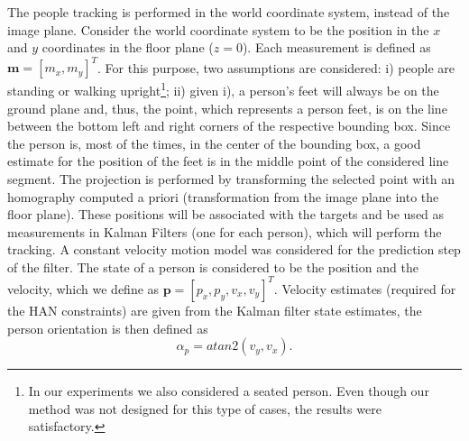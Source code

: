 \documentclass[5p,time]{elsarticle}
\begin{document}
The people tracking is performed in the world coordinate system, instead of the image plane. Consider the world coordinate system to be the position in the $x$ and $y$ coordinates in the floor plane ($z=0$). Each measurement is defined as $\mathbf{m} = [m_x,m_y]^T$. For this purpose, two assumptions are considered: i) people are standing or walking upright\footnote{In our experiments we also considered a seated person. Even though our method was not designed for this type of cases, the results were satisfactory.}; ii) given i), a person's feet will always be on the ground plane and, thus, the point, which represents a person feet, is on the line between the bottom left and right corners of the respective bounding box. Since the person is, most of the times, in the center of the bounding box, a good estimate for the position of the feet is in the middle point of the considered line segment. The projection is performed by transforming the selected point with an homography computed a priori (transformation from the image plane into the floor plane). These positions will be associated with the targets and be used as measurements in Kalman Filters (one for each person), which will perform the tracking. A constant velocity motion model was considered for the prediction step of the filter. The state of a person is considered to be the position and the velocity, which we define as $\mathbf{p} = [p_x,p_y,v_x,v_y]^T$. Velocity estimates (required for the HAN constraints) are given from the Kalman filter state estimates, the person orientation is then defined as
\begin{equation}
    \alpha_p = atan2(v_y,v_x).
    \label{eq:person_orientation}
\end{equation}
\end{document}
